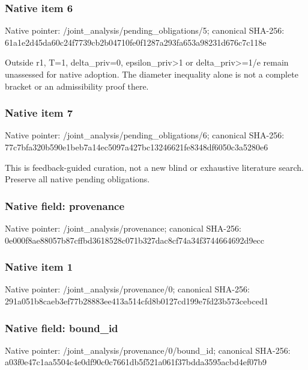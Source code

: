 \documentclass[10pt,a4paper]{article}
\begin{document}
\subsubsection{Native item 6}
Native pointer: /joint\_\allowbreak{}analysis/pending\_\allowbreak{}obligations/5; canonical SHA-256: 61a1e2d45da60c24f7739cb2b04710fe0f1287a293fa653a98231d676c7c118e

\begingroup\raggedright\sloppy Outside r1,\allowbreak{} T=\allowbreak{}1,\allowbreak{} delta\_\allowbreak{}priv=\allowbreak{}0,\allowbreak{} epsilon\_\allowbreak{}priv>1 or delta\_\allowbreak{}priv>=\allowbreak{}1/\allowbreak{}e remain unassessed for native adoption. The diameter inequality alone is not a complete bracket or an admissibility proof there.\par\endgroup

\subsubsection{Native item 7}
Native pointer: /joint\_\allowbreak{}analysis/pending\_\allowbreak{}obligations/6; canonical SHA-256: 77c7bfa320b590e1beb7a14ec5097a427bc13246621fe8348df6050c3a5280e6

\begingroup\raggedright\sloppy This is feedback-guided curation,\allowbreak{} not a new blind or exhaustive literature search. Preserve all native pending obligations.\par\endgroup

\subsubsection{Native field: provenance}
Native pointer: /joint\_\allowbreak{}analysis/provenance; canonical SHA-256: 0e000f8ae88057b87cffbd3618528c071b327dac8cf74a34f3744664692d9ecc

\subsubsection{Native item 1}
Native pointer: /joint\_\allowbreak{}analysis/provenance/0; canonical SHA-256: 291a051b8caeb3ef77b28883ee413a514cfd8b0127cd199e7fd23b573cebced1

\subsubsection{Native field: bound\_\allowbreak{}id}
Native pointer: /joint\_\allowbreak{}analysis/provenance/0/bound\_\allowbreak{}id; canonical SHA-256: a03f0e47c1aa5504c4e0df90c0c7661db5f521a061f37bdda3595acbd4ef07b9
\end{document}
